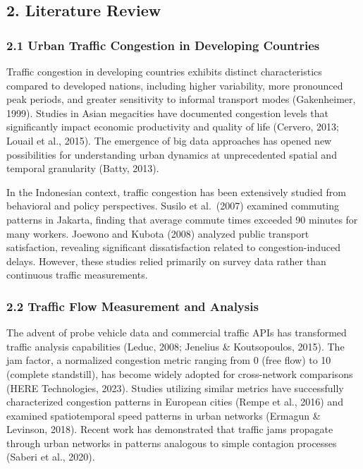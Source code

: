 \subsection{2. Literature Review}\label{literature-review}

\subsubsection{2.1 Urban Traffic Congestion in Developing Countries}\label{urban-traffic-congestion-in-developing-countries}

Traffic congestion in developing countries exhibits distinct characteristics compared to developed nations, including higher variability, more pronounced peak periods, and greater sensitivity to informal transport modes (Gakenheimer, 1999). Studies in Asian megacities have documented congestion levels that significantly impact economic productivity and quality of life (Cervero, 2013; Louail et al., 2015). The emergence of big data approaches has opened new possibilities for understanding urban dynamics at unprecedented spatial and temporal granularity (Batty, 2013).

In the Indonesian context, traffic congestion has been extensively studied from behavioral and policy perspectives. Susilo et al.~(2007) examined commuting patterns in Jakarta, finding that average commute times exceeded 90 minutes for many workers. Joewono and Kubota (2008) analyzed public transport satisfaction, revealing significant dissatisfaction related to congestion-induced delays. However, these studies relied primarily on survey data rather than continuous traffic measurements.

\subsubsection{2.2 Traffic Flow Measurement and Analysis}\label{traffic-flow-measurement-and-analysis}

The advent of probe vehicle data and commercial traffic APIs has transformed traffic analysis capabilities (Leduc, 2008; Jenelius \& Koutsopoulos, 2015). The jam factor, a normalized congestion metric ranging from 0 (free flow) to 10 (complete standstill), has become widely adopted for cross-network comparisons (HERE Technologies, 2023). Studies utilizing similar metrics have successfully characterized congestion patterns in European cities (Rempe et al., 2016) and examined spatiotemporal speed patterns in urban networks (Ermagun \& Levinson, 2018). Recent work has demonstrated that traffic jams propagate through urban networks in patterns analogous to simple contagion processes (Saberi et al., 2020).

